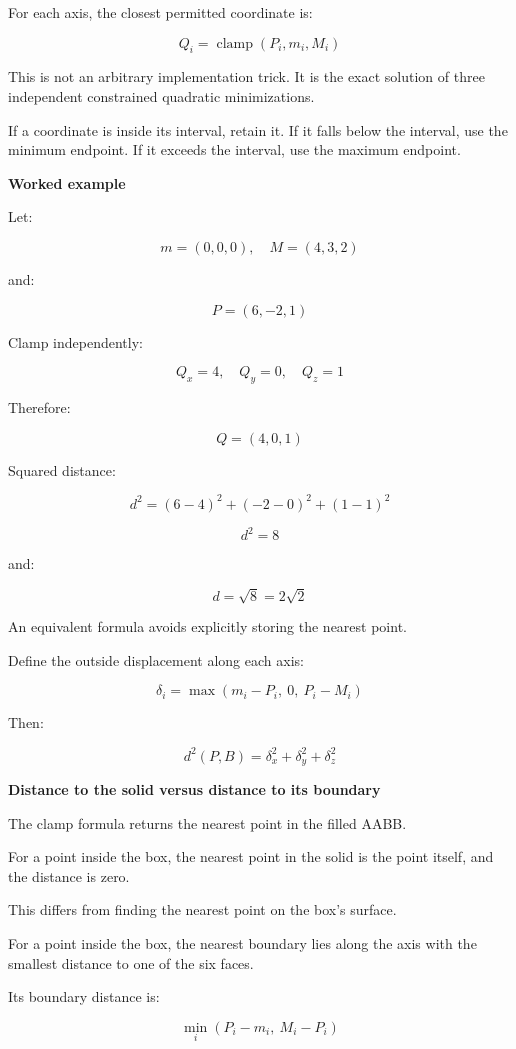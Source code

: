 For each axis, the closest permitted coordinate is:

\[
\boxed{ Q_i=\operatorname{clamp}(P_i,m_i,M_i) }
\]

This is not an arbitrary implementation trick. It is the exact solution of three independent constrained quadratic minimizations.

If a coordinate is inside its interval, retain it. If it falls below the interval, use the minimum endpoint. If it exceeds the interval, use the maximum endpoint.

\textbf{Worked example}

Let:

\[
m=(0,0,0),\quad M=(4,3,2)
\]

and:

\[
P=(6,-2,1)
\]

Clamp independently:

\[
Q_x=4,\quad Q_y=0,\quad Q_z=1
\]

Therefore:

\[
\boxed{Q=(4,0,1)}
\]

Squared distance:

\[
d^2=(6-4)^2+(-2-0)^2+(1-1)^2
\]

\[
\boxed{d^2=8}
\]

and:

\[
d=\sqrt8=2\sqrt2
\]

An equivalent formula avoids explicitly storing the nearest point.

Define the outside displacement along each axis:

\[
\delta_i=\max(m_i-P_i,\ 0,\ P_i-M_i)
\]

Then:

\[
\boxed{ d^2(P,B)=\delta_x^2+\delta_y^2+\delta_z^2 }
\]

\textbf{Distance to the solid versus distance to its boundary}

The clamp formula returns the nearest point in the filled AABB.

For a point inside the box, the nearest point in the solid is the point itself, and the distance is zero.

This differs from finding the nearest point on the box's surface.

For a point inside the box, the nearest boundary lies along the axis with the smallest distance to one of the six faces.

Its boundary distance is:

\[
\min_i(P_i-m_i,\ M_i-P_i)
\]

